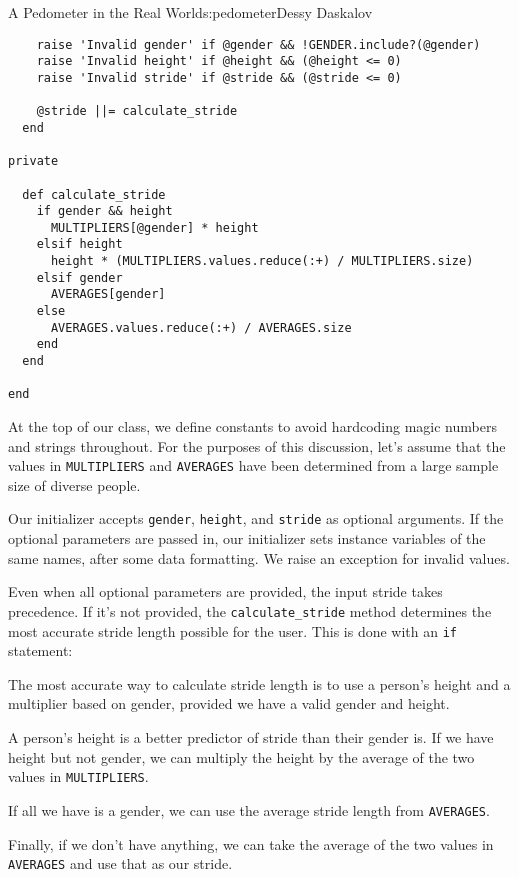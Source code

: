 \begin{aosachapter}{A Pedometer in the Real World}{s:pedometer}{Dessy Daskalov}
\begin{verbatim}
    raise 'Invalid gender' if @gender && !GENDER.include?(@gender)
    raise 'Invalid height' if @height && (@height <= 0)
    raise 'Invalid stride' if @stride && (@stride <= 0)

    @stride ||= calculate_stride
  end

private

  def calculate_stride
    if gender && height
      MULTIPLIERS[@gender] * height
    elsif height
      height * (MULTIPLIERS.values.reduce(:+) / MULTIPLIERS.size)
    elsif gender
      AVERAGES[gender]
    else
      AVERAGES.values.reduce(:+) / AVERAGES.size
    end
  end

end
\end{verbatim}

At the top of our class, we define constants to avoid hardcoding magic
numbers and strings throughout. For the purposes of this discussion,
let's assume that the values in \texttt{MULTIPLIERS} and
\texttt{AVERAGES} have been determined from a large sample size of
diverse people.

Our initializer accepts \texttt{gender}, \texttt{height}, and
\texttt{stride} as optional arguments. If the optional parameters are
passed in, our initializer sets instance variables of the same names,
after some data formatting. We raise an exception for invalid values.

Even when all optional parameters are provided, the input stride takes
precedence. If it's not provided, the \texttt{calculate\_stride} method
determines the most accurate stride length possible for the user. This
is done with an \texttt{if} statement:

\begin{aosaitemize}

\item
  The most accurate way to calculate stride length is to use a person's
  height and a multiplier based on gender, provided we have a valid
  gender and height.
\item
  A person's height is a better predictor of stride than their gender
  is. If we have height but not gender, we can multiply the height by
  the average of the two values in \texttt{MULTIPLIERS}.
\item
  If all we have is a gender, we can use the average stride length from
  \texttt{AVERAGES}.
\item
  Finally, if we don't have anything, we can take the average of the two
  values in \texttt{AVERAGES} and use that as our stride.
\end{aosaitemize}


\end{aosachapter}
